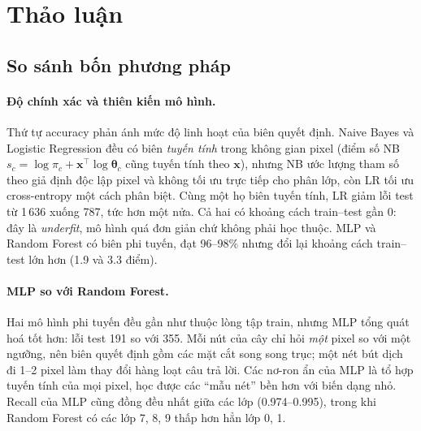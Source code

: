 \section{Thảo luận}
 
\subsection{So sánh bốn phương pháp}
 
\paragraph{Độ chính xác và thiên kiến mô hình.} Thứ tự accuracy phản ánh mức độ linh hoạt của biên quyết định. Naive Bayes và Logistic Regression đều có biên \emph{tuyến tính} trong không gian pixel (điểm số NB $s_c=\log\pi_c+\mathbf{x}^\top\log\boldsymbol\theta_c$ cũng tuyến tính theo $\mathbf{x}$), nhưng NB ước lượng tham số theo giả định độc lập pixel và không tối ưu trực tiếp cho phân lớp, còn LR tối ưu cross-entropy một cách phân biệt. Cùng một họ biên tuyến tính, LR giảm lỗi test từ 1\,636 xuống 787, tức hơn một nửa. Cả hai có khoảng cách train--test gần 0: đây là \emph{underfit}, mô hình quá đơn giản chứ không phải học thuộc. MLP và Random Forest có biên phi tuyến, đạt 96--98\% nhưng đổi lại khoảng cách train--test lớn hơn (1.9 và 3.3 điểm).
 
\paragraph{MLP so với Random Forest.} Hai mô hình phi tuyến đều gần như thuộc lòng tập train, nhưng MLP tổng quát hoá tốt hơn: lỗi test 191 so với 355. Mỗi nút của cây chỉ hỏi \emph{một} pixel so với một ngưỡng, nên biên quyết định gồm các mặt cắt song song trục; một nét bút dịch đi 1--2 pixel làm thay đổi hàng loạt câu trả lời. Các nơ-ron ẩn của MLP là tổ hợp tuyến tính của mọi pixel, học được các ``mẫu nét'' bền hơn với biến dạng nhỏ. Recall của MLP cũng đồng đều nhất giữa các lớp (0.974--0.995), trong khi Random Forest có các lớp 7, 8, 9 thấp hơn hẳn lớp 0, 1.
 
